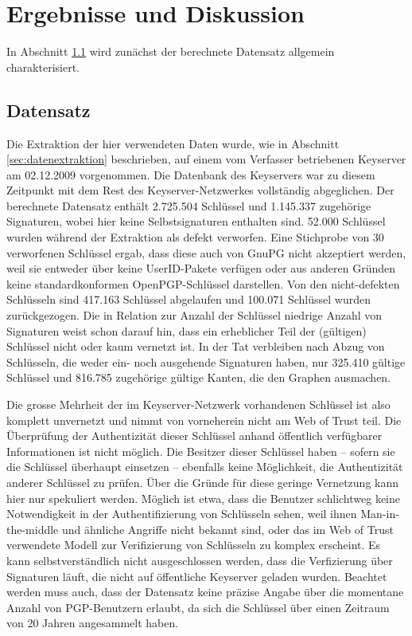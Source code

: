 
\chapter{Ergebnisse und Diskussion}
\label{ch:Ergebnisse}
In Abschnitt \ref{sec:datensatz} wird zun\"achst der berechnete
Datensatz allgemein charakterisiert. 
\section{Datensatz}
\label{sec:datensatz}

Die Extraktion der hier verwendeten Daten wurde, wie in Abschnitt
\ref{sec:datenextraktion} beschrieben, auf einem vom
Verfasser betriebenen Keyserver am 02.12.2009 vorgenommen. Die
Datenbank des Keyservers war zu diesem Zeitpunkt mit dem Rest des
Keyserver-Netzwerkes vollst\"andig abgeglichen. Der berechnete
Datensatz enth\"alt 2.725.504 Schl\"ussel und 1.145.337 zugeh\"orige
Signaturen, wobei hier keine Selbstsignaturen enthalten sind. 52.000
Schl\"ussel wurden w\"ahrend der Extraktion als defekt verworfen. Eine
Stichprobe von 30 verworfenen Schl\"ussel ergab, dass diese auch von
GnuPG nicht akzeptiert werden, weil sie entweder \"uber keine
UserID-Pakete verf\"ugen oder aus anderen Gr\"unden keine
standardkonformen OpenPGP-Schl\"ussel darstellen. Von den
nicht-defekten Schl\"usseln sind 417.163 Schl\"ussel abgelaufen und
100.071 Schl\"ussel wurden zur\"uckgezogen. Die in Relation zur Anzahl
der Schl\"ussel niedrige Anzahl von Signaturen weist schon darauf hin,
dass ein erheblicher Teil der (g\"ultigen) Schl\"ussel nicht oder kaum
vernetzt ist. In der Tat verbleiben nach Abzug von Schl\"usseln, die
weder ein- noch ausgehende Signaturen haben, nur 325.410 g\"ultige
Schl\"ussel und 816.785 zugeh\"orige g\"ultige Kanten, die den Graphen
ausmachen.

Die grosse Mehrheit der im Keyserver-Netzwerk vorhandenen Schl\"ussel
ist also komplett unvernetzt und nimmt von vorneherein nicht am Web of
Trust teil. Die \"Uberpr\"ufung der Authentizit\"at dieser Schl\"ussel
anhand \"offentlich verf\"ugbarer Informationen ist nicht
m\"oglich. Die Besitzer dieser Schl\"ussel haben -- sofern sie die
Schl\"ussel \"uberhaupt einsetzen -- ebenfalls keine M\"oglichkeit,
die Authentizit\"at anderer Schl\"ussel zu pr\"ufen. \"Uber die
Gr\"unde f\"ur diese geringe Vernetzung kann hier nur spekuliert
werden. M\"oglich ist etwa, dass die Benutzer schlichtweg keine
Notwendigkeit in der Authentifizierung von Schl\"usseln sehen, weil
ihnen Man-in-the-middle und \"ahnliche Angriffe nicht bekannt sind,
oder das im Web of Trust verwendete Modell zur Verifizierung von
Schl\"usseln zu komplex erscheint. Es kann selbstverst\"andlich nicht
ausgeschlossen werden, dass die Verfizierung \"uber Signaturen
l\"auft, die nicht auf \"offentliche Keyserver geladen
wurden. Beachtet werden muss auch, dass der Datensatz keine pr\"azise
Angabe \"uber die momentane Anzahl von PGP-Benutzern erlaubt, da sich
die Schl\"ussel \"uber einen Zeitraum von 20 Jahren angesammelt haben.

